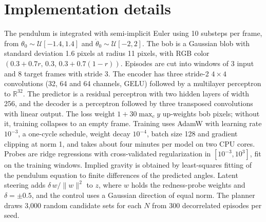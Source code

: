 \documentclass[11pt]{article}
\theoremstyle{definition}\newtheorem{definition}{Definition}
\begin{document}
\section{Implementation details}\label{app:details}
The pendulum is integrated with semi-implicit Euler using 10 substeps per frame, from $\theta_0\sim\mathcal U[-1.4,1.4]$ and $\dot\theta_0\sim\mathcal U[-2,2]$. The bob is a Gaussian blob with standard deviation 1.6 pixels at radius 11 pixels, with RGB color $(0.3+0.7r,\,0.3,\,0.3+0.7(1-r))$. Episodes are cut into windows of 3 input and 8 target frames with stride 3. The encoder has three stride-2 $4\times4$ convolutions (32, 64 and 64 channels, GELU) followed by a multilayer perceptron to $\mathbb R^{32}$. The predictor is a residual perceptron with two hidden layers of width 256, and the decoder is a perceptron followed by three transposed convolutions with linear output. The loss weight $1+30\max_c y$ up-weights bob pixels; without it, training collapses to an empty frame. Training uses AdamW with learning rate $10^{-3}$, a one-cycle schedule, weight decay $10^{-4}$, batch size 128 and gradient clipping at norm 1, and takes about four minutes per model on two CPU cores. Probes are ridge regressions with cross-validated regularization in $[10^{-3},10^3]$, fit on the training windows. Implied gravity is obtained by least-squares fitting of the pendulum equation to finite differences of the predicted angles. Latent steering adds $\delta\,w/\|w\|^2$ to $z$, where $w$ holds the redness-probe weights and $\delta=\pm0.5$, and the control uses a Gaussian direction of equal norm. The planner draws 3{,}000 random candidate sets for each $N$ from 300 decorrelated episodes per seed.
\end{document}
